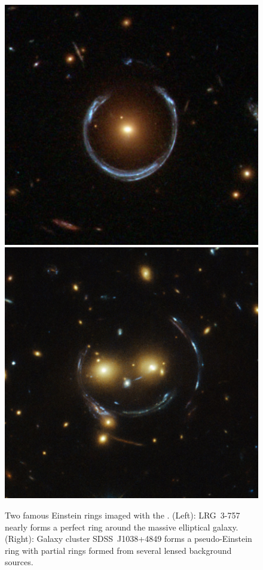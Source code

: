 \begin{figure}
\centering
\includegraphics[height=0.3\textheight]{Intro/einstein_ring_1.png}
\includegraphics[height=0.3\textheight]{Intro/einstein_ring_2.png}
\caption[\hst\ Einstein Rings]{Two famous Einstein rings imaged with the \hst. (Left): LRG~3-757 nearly forms a perfect ring around the massive elliptical galaxy. (Right): Galaxy cluster SDSS~J1038+4849 forms a pseudo-Einstein ring with partial rings formed from several lensed background sources.}
\label{intro:fig:einstein_ring}
\end{figure}

